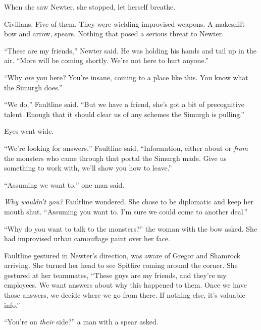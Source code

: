 When she saw Newter, she stopped, let herself breathe.



Civilians.  Five of them.  They were wielding improvised weapons.  A makeshift bow and arrow, spears.  Nothing that posed a serious threat to Newter.



``These are my friends,'' Newter said.  He was holding his hands and tail up in the air.  ``More will be coming shortly.  We're not here to hurt anyone.''



``Why \emph{are} you here?  You're insane, coming to a place like this.  You know what the Simurgh does.''



``We do,'' Faultline said.  ``But we have a friend, she's got a bit of precognitive talent.  Enough that it should clear us of any schemes the Simurgh is pulling.''



Eyes went wide.



``We're looking for answers,'' Faultline said.  ``Information, either about or \emph{from} the monsters who came through that portal the Simurgh made.  Give us something to work with, we'll show you how to leave.''



``Assuming we want to,'' one man said.



\emph{Why wouldn't you?}  Faultline wondered.  She chose to be diplomatic and keep her mouth shut.  ``Assuming you want to.  I'm sure we could come to another deal.''



``Why do you want to talk to the monsters?'' the woman with the bow asked.  She had improvised urban camouflage paint over her face.



Faultline gestured in Newter's direction, was aware of Gregor and Shamrock arriving.  She turned her head to see Spitfire coming around the corner.  She gestured at her teammates, ``These guys are my friends, and they're my employees.  We want answers about why this happened to them.  Once we have those answers, we decide where we go from there.  If nothing else, it's valuable info.''



``You're on \emph{their} side?'' a man with a spear asked.




